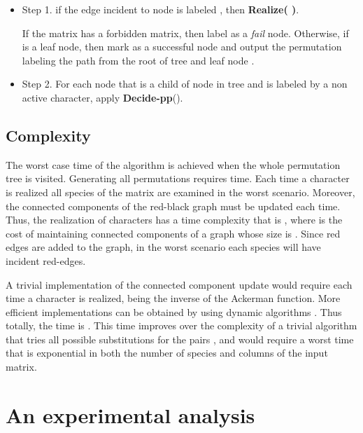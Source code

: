 \documentclass{llncs}
\newcommand{\pp}{Decide-pp}
\newcommand{\grb}{ }
\begin{document}
\begin{itemize}

\item Step 1.  if  the edge incident to node  is labeled , then  {\bf Realize( \grb )}. 

 If the matrix  has a  forbidden matrix, then label  as a {\em fail} node. Otherwise, if  is a leaf node, then mark  as a  successful node and output the permutation labeling the path from the root  of tree  and leaf node . 




\item Step 2. For each node   that is a  child of node  in tree  and is labeled by a non active character, 
apply  {\bf \pp}().



\end{itemize}





\subsection{Complexity}
The worst case time  of the algorithm is achieved when  the whole permutation tree  is visited. Generating all permutations requires  time.
Each time a character  is realized  all species of the matrix are examined in the worst scenario.   Moreover, the connected components of the red-black graph must be updated each time.
Thus, the realization of   characters has a time complexity that is , where  is the cost of maintaining connected components of a graph whose size is .  Since red edges are added  to the graph, in the worst  scenario each species   will have  incident red-edges. 

A trivial implementation of the connected component update  would require  each time a character is realized,   being  the inverse of the Ackerman function. More efficient  implementations can be obtained  by  using dynamic algorithms \cite{Holm}.   Thus  totally,  the time is .
This time improves over the complexity of a trivial   algorithm that  tries all possible substitutions for the pairs , and would require a worst time that is   exponential in both the number of species and columns of the input matrix.


\section{An experimental analysis}
\label{experiment}
\end{document}
